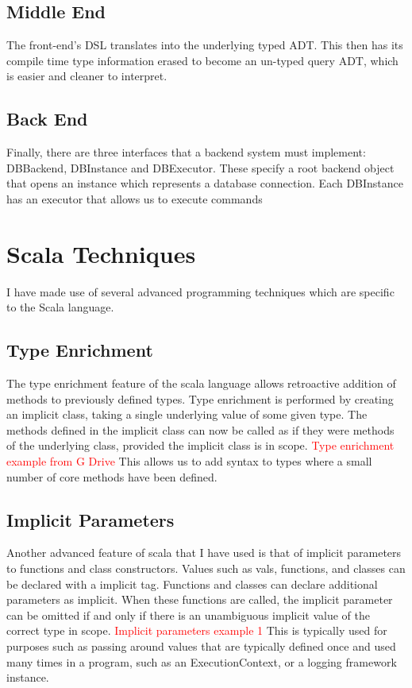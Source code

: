 \documentclass[12pt,a4paper,twoside,openright]{report}
\newcommand\todo[1]{\textcolor{red}{#1}}
\begin{document}
\subsection{Middle End}
The front-end’s DSL translates into the underlying typed ADT. This then has its compile time type information erased to become an un-typed query ADT, which is easier and cleaner to interpret.
\subsection{Back End}
Finally, there are three interfaces that a backend system must implement: DBBackend, DBInstance and DBExecutor. These specify a root backend object that opens an instance which represents a database connection. Each DBInstance has an executor that allows us to execute commands

\section{Scala Techniques}
I have made use of several advanced programming techniques which are specific to the Scala language.

\subsection{Type Enrichment}
The type enrichment feature of the scala language allows retroactive addition of methods to previously defined types. Type enrichment is performed by creating an implicit class, taking a single underlying value of some given type. The methods defined in the implicit class can now be called as if they were methods of the underlying class, provided the implicit class is in scope.
\todo{Type enrichment example from G Drive}
This allows us to add syntax to types where a small number of core methods have been defined.

\subsection{Implicit Parameters}
Another advanced feature of scala that  I have used is that of implicit  parameters to functions and class constructors. Values such as vals, functions, and classes can be declared with a implicit tag. Functions and classes can declare additional parameters as implicit. When these functions are called, the implicit parameter can be omitted if and only if there is an unambiguous implicit value of the correct type in scope.
\todo{Implicit parameters example 1}
This is typically used for purposes such as passing around values that are typically defined once and used many times in a program, such as an ExecutionContext, or a logging framework instance.
\end{document}
